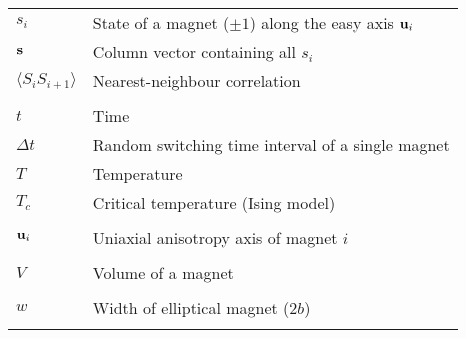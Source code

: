 \begin{longtable}[l]{p{60pt} p{350pt}}
	$s_i$ & State of a magnet ($\pm 1$) along the easy axis $\boldsymbol{\mathbf{u}}_i$ \\
	$\boldsymbol{\mathbf{s}}$ & Column vector containing all $s_i$ \\
	$\langle S_i S_{i+1} \rangle$ & Nearest-neighbour correlation \\
	&\\

	$t$ & Time \\
	$\Delta t$ & Random switching time interval of a single magnet \\
	$T$ & Temperature \\
	$T_c$ & Critical temperature (Ising model) \\
	&\\

	$\boldsymbol{\mathbf{u}}_i$ & Uniaxial anisotropy axis of magnet $i$ \\
	&\\

	$V$ & Volume of a magnet \\
	&\\

	$w$ & Width of elliptical magnet ($2b$) \\
	&\\
\end{longtable}

